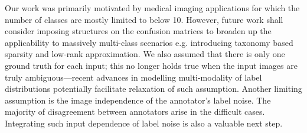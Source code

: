 Our work was primarily motivated by medical imaging applications for which the number of classes are mostly limited to below 10. However, future work shall consider imposing structures on the confusion matrices to broaden up the applicability to massively multi-class scenarios e.g. introducing taxonomy based sparsity \cite{van2018lean} and low-rank approximation. We also assumed that there is only one ground truth for each input; this no longer holds true when the input images are truly ambiguous---recent advances in modelling multi-modality of label distributions \cite{saeedi2017multimodal,kohl2018probabilistic} potentially facilitate relaxation of such assumption. Another limiting assumption is the image independence of the annotator's label noise. The majority of disagreement between annotators arise in the difficult cases. Integrating such input dependence of label noise \cite{yan2010modeling,xiao2015learning} is also a valuable next step.




